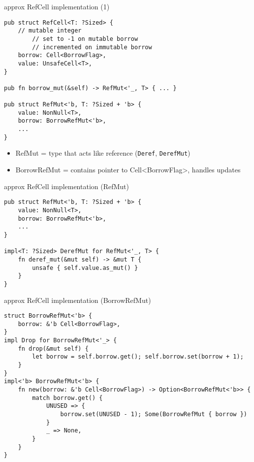 
\begin{frame}[fragile]{approx RefCell implementation (1)}
\begin{verbatim}
pub struct RefCell<T: ?Sized> {
    // mutable integer
        // set to -1 on mutable borrow
        // incremented on immutable borrow
    borrow: Cell<BorrowFlag>,
    value: UnsafeCell<T>,
}

pub fn borrow_mut(&self) -> RefMut<'_, T> { ... }

pub struct RefMut<'b, T: ?Sized + 'b> {
    value: NonNull<T>,
    borrow: BorrowRefMut<'b>,
    ...
}
\end{verbatim}
\begin{itemize}
\item RefMut = type that acts like reference (\texttt{Deref}, \texttt{DerefMut})
\item BorrowRefMut = contains pointer to Cell<BorrowFlag>, handles updates
\end{itemize}
\end{frame}

\begin{frame}[fragile]{approx RefCell implementation (RefMut)}
\begin{verbatim}
pub struct RefMut<'b, T: ?Sized + 'b> {
    value: NonNull<T>,
    borrow: BorrowRefMut<'b>,
    ...
}

impl<T: ?Sized> DerefMut for RefMut<'_, T> {
    fn deref_mut(&mut self) -> &mut T {
        unsafe { self.value.as_mut() }
    }
}
\end{verbatim}
\end{frame}


\begin{frame}[fragile]{approx RefCell implementation (BorrowRefMut)}
\begin{verbatim}
struct BorrowRefMut<'b> {
    borrow: &'b Cell<BorrowFlag>,
}
impl Drop for BorrowRefMut<'_> {
    fn drop(&mut self) {
        let borrow = self.borrow.get(); self.borrow.set(borrow + 1);
    }
}
impl<'b> BorrowRefMut<'b> {
    fn new(borrow: &'b Cell<BorrowFlag>) -> Option<BorrowRefMut<'b>> {
        match borrow.get() {
            UNUSED => {
                borrow.set(UNUSED - 1); Some(BorrowRefMut { borrow })
            }
            _ => None,
        }
    }
}
\end{verbatim}
\end{frame}

